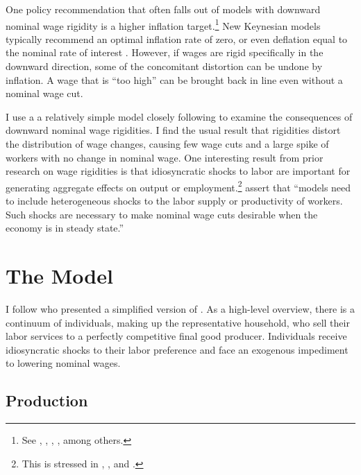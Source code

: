 \documentclass[12pt,a4paper]{scrartcl}            %
\begin{document}
One policy recommendation that often falls out of models with downward nominal wage rigidity is a higher inflation target.\footnote{
    See \cite{tobin_1972}, \cite{akerlof_dickens_perry_1996}, \cite{kim_ruge-murcia_2011}, \cite{coibon_gorodnichenko_wieland_2012}, among others.
}
New Keynesian models typically recommend an optimal inflation rate of zero, or even deflation equal to the nominal rate of interest \citep{schmitt-grohe_uribe_2010}.
However, if wages are rigid specifically in the downward direction, some of the concomitant distortion can be undone by inflation.
A wage that is ``too high'' can be brought back in line even without a nominal wage cut.

I use a a relatively simple model closely following \cite{daly_hobijn_2013} to examine the consequences of downward nominal wage rigidities.
I find the usual result that rigidities distort the distribution of wage changes, causing few wage cuts and a large spike of workers with no change in nominal wage.
One interesting result from prior research on wage rigidities is that idiosyncratic shocks to labor are important for generating aggregate effects on output or employment.\footnote{
This is stressed in \cite{elsby_2009}, \cite{benigno_ricci_2011}, and \cite{daly_hobijn_2013}.}
\cite{daly_hobijn_2013} assert that ``models need to include heterogeneous shocks to the labor supply or productivity of workers. Such shocks are necessary to make nominal wage cuts desirable when the economy is in steady state.''


\section{The Model}
\label{sec:the_model}

I follow \cite{daly_hobijn_2013} who presented a simplified version of \cite{benigno_ricci_2011}.
As a high-level overview, there is a continuum of individuals, making up the representative household, who sell their labor services to a perfectly competitive final good producer.
Individuals receive idiosyncratic shocks to their labor preference and face an exogenous impediment to lowering nominal wages.

\subsection{Production}
\label{sub:production}
\end{document}
